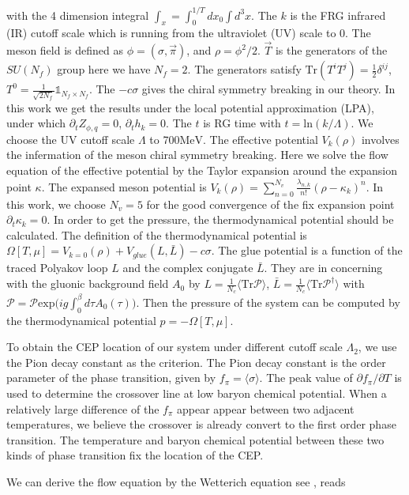 \documentclass[%
reprint,
superscriptaddress,
showpacs,preprintnumbers,
 amsmath,amssymb,
 aps,
prl,
]{revtex4-1}
\begin{document}
with the 4 dimension integral $\int_x=\int^{1/T}_0dx_0\int d^3x$. The $k$ is the FRG infrared (IR) cutoff scale which is running from the ultraviolet (UV) scale to 0. The meson field is defined as $\phi=(\sigma,\vec{\pi})$, and $\rho=\phi^2/2$. $\vec{T}$ is the generators of the $SU(N_f)$ group here we have $N_f=2$. The generators satisfy $\mathrm{Tr}(T^iT^j)=\frac{1}{2}\delta^{ij}$, $T^0=\frac{1}{\sqrt{2N_f}}\mathbb{1}_{N_f\times N_f}$. The $-c\sigma$ gives the chiral symmetry breaking in our theory. In this work we get the results under the local potential approximation (LPA), under which $\partial_tZ_{\phi,q}=0$, $\partial_t h_k=0$. The $t$ is RG time with $t=\mathrm{ln}(k/\Lambda)$. We choose the UV cutoff scale $\Lambda$ to 700$\mathrm{MeV}$. The effective potential $V_k(\rho)$ involves the infermation of the meson chiral symmetry breaking. Here we solve the flow equation of the effective potential by the Taylor expansion around the expansion point $\kappa$. The expansed meson potential is $V_k(\rho)=\sum^{N_v}_{n=0}\frac{\lambda_{n,k}}{n!}(\rho-\kappa_k)^n$. In this work, we choose $N_v=5$ for the good convergence of the fix expansion point $\partial_t\kappa_k=0$. In order to get the pressure, the thermodynamical potential should be calculated. The definition of the thermodynamical potential is $\Omega[T,\mu]=V_{k=0}(\rho)+V_{glue}(L,\bar{L})-c\sigma$. The glue potential is a function of the traced Polyakov loop $L$ and the complex conjugate $\bar{L}$. They are in concerning with the gluonic background field $A_0$ by $L=\frac{1}{N_c}\langle \mathrm{Tr}\mathcal{P}\rangle$, $\bar{L}=\frac{1}{N_c}\langle \mathrm{Tr}\mathcal{P}^\dagger\rangle$ with $\mathcal{P}=\mathcal{P}\mathrm{exp}\big(ig\int^\beta_0d\tau A_0(\tau)\big)$. Then the pressure of the system can be computed by the thermodynamical potential $p=-\Omega[T,\mu]$.\par To obtain the CEP location of our system under different cutoff scale $\Lambda_2$, we use the Pion decay constant as the criterion. The Pion decay constant is the order parameter of the phase transition, given by $f_{\pi}=\langle \sigma\rangle$. The peak value of $\partial f_\pi/\partial T$ is used to determine the crossover line at low baryon chemical potential. When a relatively large difference of the $f_\pi$ appear appear between two adjacent temperatures, we believe the crossover is already convert to the first order phase transition. The temperature and baryon chemical potential between these two kinds of phase transition fix the location of the CEP.\par We can derive the flow equation by the Wetterich equation see \cite{Wetterich:1992yh}, reads
\end{document}
